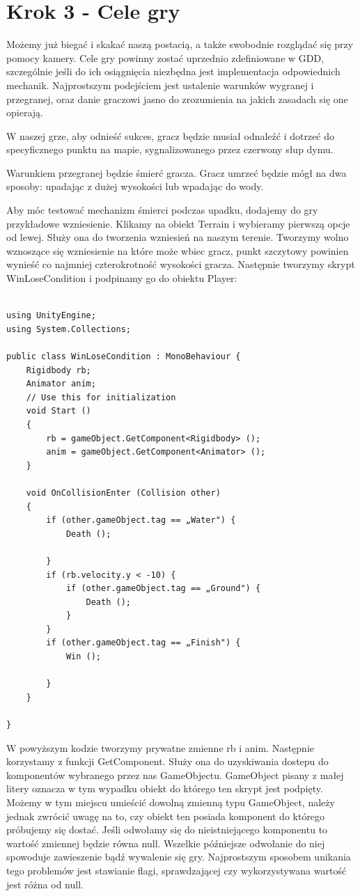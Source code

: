 \documentclass[openright]{xmgr}
\begin{document}
\section{Krok 3 - Cele gry}

Możemy już biegać i skakać naszą postacią, a także swobodnie rozglądać się przy pomocy kamery. Cele gry powinny zostać uprzednio zdefiniowane w GDD, szczególnie jeśli do ich osiągnięcia niezbędna jest implementacja odpowiednich mechanik. Najprostszym podejściem jest ustalenie warunków wygranej i przegranej, oraz danie graczowi jasno do zrozumienia na jakich zasadach się one opierają.

W naszej grze, aby odnieść sukces, gracz będzie musiał odnaleźć i dotrzeć do specyficznego punktu na mapie, sygnalizowanego przez czerwony słup dymu.

Warunkiem przegranej będzie śmierć gracza. Gracz umrzeć będzie mógł na dwa sposoby: upadając z dużej wysokości lub wpadając do wody.

Aby móc testować mechanizm śmierci podczas upadku, dodajemy do gry przykładowe wzniesienie. Klikamy na obiekt Terrain i wybieramy pierwszą opcje od lewej. Służy ona do tworzenia wzniesień na naszym terenie. Tworzymy wolno wznoszące się wzniesienie na które może wbiec gracz, punkt szczytowy powinien wynieść co najmniej czterokrotność wysokości gracza. Następnie tworzymy skrypt WinLoseCondition i podpinamy go do obiektu Player:

\begin{lstlisting}

using UnityEngine;
using System.Collections;

public class WinLoseCondition : MonoBehaviour {
    Rigidbody rb;
    Animator anim;
    // Use this for initialization
    void Start ()
    {
        rb = gameObject.GetComponent<Rigidbody> ();
        anim = gameObject.GetComponent<Animator> ();
    }

    void OnCollisionEnter (Collision other)
    {
        if (other.gameObject.tag == „Water") {
            Death ();

        }
        if (rb.velocity.y < -10) {
            if (other.gameObject.tag == „Ground") {
                Death ();
            }
        }
        if (other.gameObject.tag == „Finish") {
            Win ();

        }
    }

}

\end{lstlisting}

W powyższym kodzie tworzymy prywatne zmienne rb i anim. Następnie korzystamy z funkcji GetComponent. Służy ona do uzyskiwania dostepu do komponentów wybranego przez nas GameObjectu. GameObject pisany z małej litery oznacza w tym wypadku obiekt do którego ten skrypt jest podpięty. Możemy w tym miejscu umieścić dowolną zmienną typu GameObject, należy jednak zwrócić uwagę na to, czy obiekt ten posiada komponent do którego próbujemy się dostać. Jeśli odwołamy się do nieistniejącego komponentu to wartość zmiennej będzie równa null. Wszelkie późniejsze odwołanie do niej spowoduje zawieszenie bądź wywalenie się gry. Najprostszym sposobem unikania tego problemów jest stawianie flagi, sprawdzającej czy wykorzystywana wartość jest różna od null.
\end{document}
